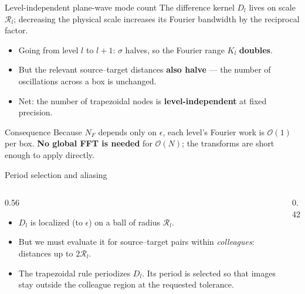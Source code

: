 \documentclass[aspectratio=169,11pt]{beamer}
\newcommand{\cO}{\mathcal{O}}
\newcommand{\cR}{\mathcal{R}}
\newcommand{\x}{\bm{x}}
\newcommand{\hl}[1]{{\color{CCMorange}\textbf{#1}}}
\begin{document}
\begin{frame}{Level-independent plane-wave mode count}
\small
The difference kernel \(D_l\) lives on scale \(\cR_l\); decreasing the physical scale increases its Fourier bandwidth by the reciprocal factor.
\begin{itemize}
  \item Going from level \(l\) to \(l+1\): \(\sigma\) halves, so the Fourier range \(K_l\) \hl{doubles}.
  \item But the relevant source--target distances \hl{also halve} --- the number of oscillations across a box is unchanged.
  \item Net: the number of trapezoidal nodes is \hl{level-independent} at fixed precision.
\end{itemize}
\begin{block}{Consequence}
Because \(N_F\) depends only on \(\epsilon\), each level's Fourier work is \(\cO(1)\) per box. \hl{No global FFT is needed} for \(\cO(N)\); the transforms are short enough to apply directly.
\end{block}
\end{frame}

\begin{frame}{Period selection and aliasing}
\small
\begin{columns}[T,totalwidth=\textwidth]
\begin{column}{0.56\textwidth}
\begin{itemize}
  \item \(D_l\) is localized (to \(\epsilon\)) on a ball of radius \(\cR_l\).
  \item But we must evaluate it for source--target pairs within \emph{colleagues}: distances up to \(2\cR_l\).
  \item The trapezoidal rule periodizes \(D_l\). Its period is selected so that images stay outside the colleague region at the requested tolerance.
\end{itemize}
\end{column}
\begin{column}{0.42\textwidth}
\centering
{}
\end{column}
\end{columns}
\end{frame}
\end{document}
